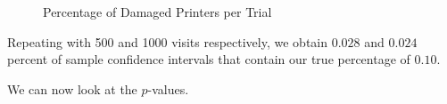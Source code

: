 \documentclass[10pt]{report}\usepackage[]{graphicx}\usepackage[]{xcolor}
\newenvironment{knitrout}{}{} %
\begin{document}
\begin{easylist}[enumerate]
\begin{knitrout}
\begin{figure}[H]
{\centering {}

}

\caption[Percentage of Damaged Printers per Trial]{Percentage of Damaged Printers per Trial}\label{fig:multivisits_new}
\end{figure}


\end{knitrout}

        Repeating with 500 and 1000 visits respectively, we obtain $0.028$ and
        $0.024$ percent of sample confidence intervals that contain our true percentage of
        $0.10$.\newline

        We can now look at the $p$-values.


\end{easylist}
\end{document}
